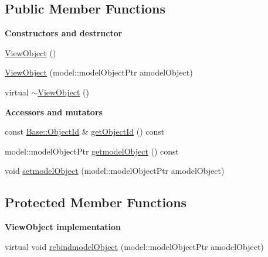 \subsection*{Public Member Functions}
\begin{Indent}{\bf Constructors and destructor}\par
\begin{DoxyCompactItemize}
\item 
\hyperlink{class_view_1_1_view_object_aa54c31897c07be82e15f595736f4ebe9}{View\+Object} ()
\item 
\hyperlink{class_view_1_1_view_object_abbc94f6ef3de75d64602e4d26694f2cc}{View\+Object} (model\+::\+model\+Object\+Ptr a\+model\+Object)
\item 
virtual \hyperlink{class_view_1_1_view_object_aeece80891c9da5b57181e3c42ce25eec}{$\sim$\+View\+Object} ()
\end{DoxyCompactItemize}
\end{Indent}
\begin{Indent}{\bf Accessors and mutators}\par
\begin{DoxyCompactItemize}
\item 
const \hyperlink{class_base_1_1_object_id}{Base\+::\+Object\+Id} \& \hyperlink{class_view_1_1_view_object_af1779cd5a68017ff5a1ece2afec8ddc0}{get\+Object\+Id} () const 
\item 
model\+::\+model\+Object\+Ptr \hyperlink{class_view_1_1_view_object_a84ff0c9baf21a4736dacaf0811ea0851}{get\+model\+Object} () const
\item 
void \hyperlink{class_view_1_1_view_object_aff22ce3c0e7d0db12837f16902595c24}{set\+model\+Object} (model\+::\+model\+Object\+Ptr a\+model\+Object)
\end{DoxyCompactItemize}
\end{Indent}
\subsection*{Protected Member Functions}
\begin{Indent}{\bf View\+Object implementation}\par
\begin{DoxyCompactItemize}
\item 
virtual void \hyperlink{class_view_1_1_view_object_a7b0dee4ac27877d28968858214e708e3}{rebind\+model\+Object} (model\+::\+model\+Object\+Ptr a\+model\+Object)
\end{DoxyCompactItemize}
\end{Indent}


